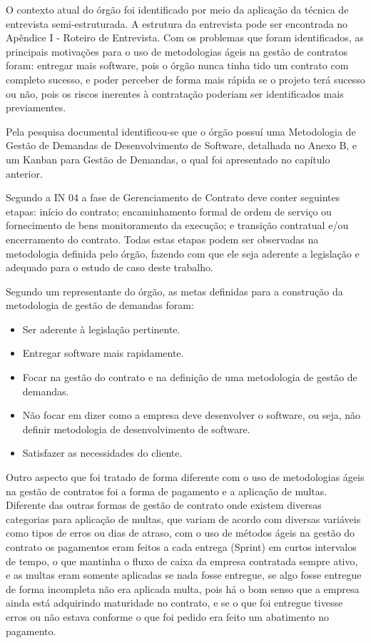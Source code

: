 O contexto atual do órgão foi identificado por meio da aplicação da técnica de entrevista semi-estruturada. A estrutura da entrevista pode ser encontrada no Apêndice I -  Roteiro de Entrevista.  Com os problemas que foram identificados, as principais motivações para o uso de metodologias ágeis na gestão de contratos foram: entregar mais software, pois o órgão nunca tinha tido um contrato com completo sucesso, e poder perceber de forma mais rápida se o projeto terá sucesso ou não, pois os riscos inerentes à contratação poderiam ser identificados mais previamentes.

Pela pesquisa documental identificou-se que o órgão possuí uma Metodologia de Gestão de Demandas de Desenvolvimento de Software, detalhada no Anexo B, e um Kanban para Gestão de 
Demandas, o qual foi apresentado no capítulo anterior. 

Segundo a IN 04 a fase de Gerenciamento de Contrato deve conter seguintes etapas: início do contrato; encaminhamento formal de ordem de serviço ou fornecimento de bens  monitoramento da execução; e transição contratual e/ou encerramento do contrato. Todas estas etapas podem ser observadas na metodologia definida pelo órgão, fazendo com que ele seja aderente a legislação e adequado para o estudo de caso deste trabalho.

Segundo um representante do órgão, as metas definidas para a construção da metodologia de gestão de demandas foram:
\begin{itemize}
\item Ser aderente à legislação pertinente.
\item Entregar software mais rapidamente.
\item Focar na gestão do contrato e na definição de uma metodologia de gestão de demandas.
\item Não focar em dizer como a empresa deve desenvolver o software, ou seja, não definir metodologia de desenvolvimento de software.
\item Satisfazer as necessidades do cliente.
\end{itemize}

Outro aspecto que foi tratado de forma diferente com o uso de metodologias ágeis na gestão de contratos foi a forma de pagamento e a aplicação de multas. Diferente das outras formas de gestão de contrato onde existem diversas categorias para aplicação de multas, que variam de acordo com diversas variáveis como tipos de erros ou dias de atraso, com o uso de métodos ágeis na gestão do contrato os pagamentos eram feitos a cada entrega (Sprint) em curtos intervalos de tempo, o que mantinha o fluxo de caixa da empresa contratada sempre ativo, e as multas eram somente aplicadas se nada fosse entregue, se algo fosse entregue de forma incompleta não era aplicada multa, pois há o bom senso que a empresa ainda está adquirindo maturidade no contrato, e se o que foi entregue tivesse erros ou não estava conforme o que foi pedido era feito um abatimento no pagamento.

